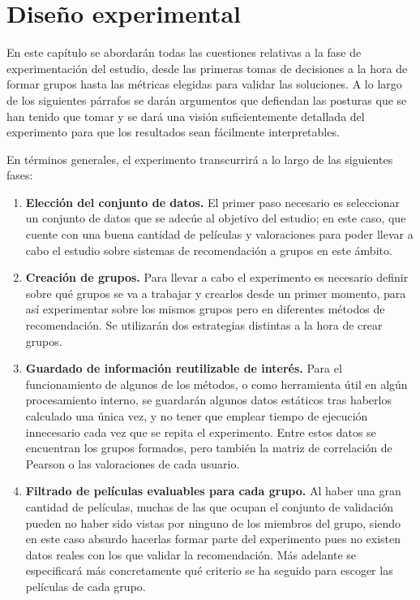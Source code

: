 \chapter{Diseño experimental}

En este capítulo se abordarán todas las cuestiones relativas a la fase de experimentación del estudio, desde las primeras tomas de decisiones a la hora de formar grupos hasta las métricas elegidas para validar las soluciones. A lo largo de los siguientes párrafos se darán argumentos que defiendan las posturas que se han tenido que tomar y se dará una visión suficientemente detallada del experimento para que los resultados sean fácilmente interpretables.

En términos generales, el experimento transcurrirá a lo largo de las siguientes fases:

\begin{enumerate}
	\item \textbf{Elección del conjunto de datos.} El primer paso necesario es seleccionar un conjunto de datos que se adecúe al objetivo del estudio; en este caso, que cuente con una buena cantidad de películas y valoraciones para poder llevar a cabo el estudio sobre sistemas de recomendación a grupos en este ámbito.
	\item \textbf{Creación de grupos.} Para llevar a cabo el experimento es necesario definir sobre qué grupos se va a trabajar y crearlos desde un primer momento, para así experimentar sobre los mismos grupos pero en diferentes métodos de recomendación. Se utilizarán dos estrategias distintas a la hora de crear grupos.
	\item \textbf{Guardado de información reutilizable de interés.} Para el funcionamiento de algunos de los métodos, o como herramienta útil en algún procesamiento interno, se guardarán algunos datos estáticos tras haberlos calculado una única vez, y no tener que emplear tiempo de ejecución innecesario cada vez que se repita el experimento. Entre estos datos se encuentran los grupos formados, pero también la matriz de correlación de Pearson o las valoraciones de cada usuario.
	\item \textbf{Filtrado de películas evaluables para cada grupo.} Al haber una gran cantidad de películas, muchas de las que ocupan el conjunto de validación pueden no haber sido vistas por ninguno de los miembros del grupo, siendo en este caso absurdo hacerlas formar parte del experimento pues no existen datos reales con los que validar la recomendación. Más adelante se especificará más concretamente qué criterio se ha seguido para escoger las películas de cada grupo.

\end{enumerate}
